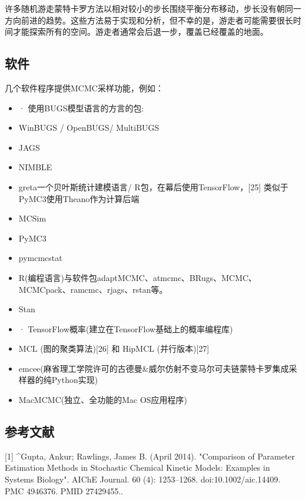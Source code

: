 许多随机游走蒙特卡罗方法以相对较小的步长围绕平衡分布移动，步长没有朝同一方向前进的趋势。这些方法易于实现和分析，但不幸的是，游走者可能需要很长时间才能探索所有的空间。游走者通常会后退一步，覆盖已经覆盖的地面。

\subsection{软件}

几个软件程序提供MCMC采样功能，例如：

\begin{itemize}
\item · 使用BUGS模型语言的方言的包:
\end{itemize}

\begin{itemize}
\item WinBUGS / OpenBUGS/ MultiBUGS
\item JAGS
\item NIMBLE
\end{itemize}

\begin{itemize}
\item greta一个贝叶斯统计建模语言/ R包，在幕后使用TensorFlow，[25] 类似于PyMC3使用Theano作为计算后端
\item MCSim
\item PyMC3
\item pymcmcstat
\item R(编程语言)与软件包adaptMCMC、atmcmc、BRugs、MCMC、MCMCpack、ramcmc、rjags、rstan等。
\item Stan
\item · TensorFlow概率(建立在TensorFlow基础上的概率编程库)
\item MCL (图的聚类算法)[26] 和 HipMCL (并行版本)[27]
\item emcee(麻省理工学院许可的古德曼&威尔仿射不变马尔可夫链蒙特卡罗集成采样器的纯Python实现)
\item MacMCMC(独立、全功能的Mac OS应用程序) 
\end{itemize}

\subsection{参考文献}

[1]
^Gupta, Ankur; Rawlings, James B. (April 2014). "Comparison of Parameter Estimation Methods in Stochastic Chemical Kinetic Models: Examples in Systems Biology". AIChE Journal. 60 (4): 1253–1268. doi:10.1002/aic.14409. PMC 4946376. PMID 27429455..

